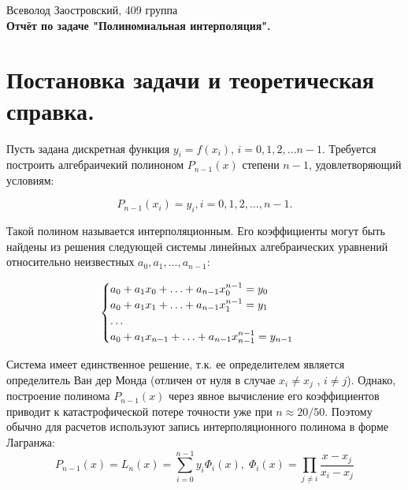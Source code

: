 \documentclass[14pt,a4paper]{extarticle}
\newcommand{\1}{\mathbbm{1}}
\begin{document}
\begin{center}

{Всеволод Заостровский, 409 группа}\\
{\bfseries Отчёт по задаче "Полиномиальная интерполяция".\\}
\vspace{1cm}

\end{center}

\section{Постановка задачи и теоретическая справка.}
Пусть задана дискретная функция $y_i = f(x_i)$, $i = 0, 1, 2, . . . n - 1$.
Требуется построить алгебраичекий полиноном $P_{n-1}(x)$ степени $n - 1$, удовлетворяющий условиям:

\begin{equation}
    P_{n-1}(x_i) = y_i, i = 0, 1, 2, . . . , n - 1.
\end{equation}

Такой полином называется интерполяционным. Его коэффициенты могут 
быть найдены из решения следующей системы линейных алгебраических
уравнений относительно неизвестных $a_0, a_1, ..., a_{n-1}$:

\begin{equation*}
    \begin{cases}
    a_0 + a_1 x_0 + \ldots + a_{n-1} x^{n-1}_0 = y_0 \\
    a_0 + a_1 x_1 + \ldots + a_{n-1} x^{n-1}_1 = y_1 \\
    \ldots \\
    a_0 + a_1 x_{n-1} + \ldots + a_{n-1} x^{n-1}_{n-1} = y_{n-1} $ $
    \end{cases}
\end{equation*}

Система имеет единственное решение, т.к. ее определителем является определитель Ван дер Монда 
(отличен от нуля в случае $x_i \neq x_j$ , $i \neq j$). Однако,
построение полинома $P_{n-1}(x)$ через явное вычисление его коэффициентов
приводит к катастрофической потере точности уже при $n \approx 20 / 50$. 
Поэтому обычно для расчетов используют запись интерполяционного полинома
в форме Лагранжа:
\begin{equation*}
    P_{n-1}(x) = L_n(x) = \sum\limits_{i=0}^{n-1} y_i \Phi_i(x), \; \Phi_i(x) = \prod\limits_{j \neq i} \frac{x - x_j}{x_i - x_j}
\end{equation*}
\end{document}
